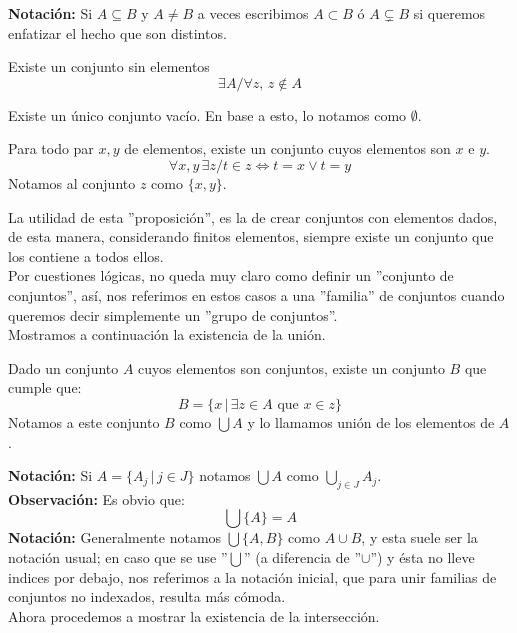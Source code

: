 \documentclass[12pt,a4paper]{book}
\begin{document}
\textbf{Notación:} Si $A \subseteq B$ y $A \neq B$ a veces escribimos $A \subset B$ ó $A \subsetneq B$ si queremos enfatizar el hecho que son distintos.

\begin{prop} %
Existe un conjunto sin elementos
$$ \exists A \slash \forall z , \, z \notin A $$ 
\end{prop}
\begin{ej}
Existe un único conjunto vacío. En base a esto, lo notamos como $\emptyset$.
\end{ej}
\begin{prop} %
Para todo par $x,y$ de elementos, existe un conjunto cuyos elementos son $x$ e $y$.
$$ \forall x,y \, \exists z \slash t\in z \Leftrightarrow t=x \vee t=y$$
Notamos al conjunto $z$ como $ \lbrace x,y \rbrace $.
\end{prop}
La utilidad de esta ''proposición'', es la de crear conjuntos con elementos dados, de esta manera, considerando finitos elementos, siempre existe un conjunto que los contiene a todos ellos. \\[0.5cm]
Por cuestiones lógicas, no queda muy claro como definir un ''conjunto de conjuntos'', así, nos referimos en estos casos a una ''familia'' de conjuntos cuando queremos decir simplemente un ''grupo de conjuntos''. \\[0.5 cm]
Mostramos a continuación la existencia de la unión.

\begin{prop} %
Dado un conjunto $A$ cuyos elementos son conjuntos, existe un conjunto $B$ que cumple que: \\
$$ B = \lbrace x \,\vert\, \exists z \in A \mbox{ que } x \in z \rbrace $$
Notamos a este conjunto $B$ como $\bigcup A$ y lo llamamos unión de los elementos de $A$.
\end{prop}

\textbf{Notación:} Si $A = \lbrace A_{j} \,\vert\, j \in J \rbrace$ notamos $\bigcup A$ como $\bigcup_{j\in J} A_{j}$.\\[0.5cm]
\textbf{Observación:} Es obvio que:
$$\bigcup \lbrace A \rbrace = A$$
\textbf{Notación:} Generalmente notamos $ \bigcup \lbrace A,B \rbrace$ como $A \cup B$, y esta suele ser la notación usual; en caso que se use ''$\bigcup$'' (a diferencia de ''$\cup$'') y ésta no lleve indices por debajo, nos referimos a la notación inicial, que para unir familias de conjuntos no indexados, resulta más cómoda.\\[0.5cm]
Ahora procedemos a mostrar la existencia de la intersección.
\end{document}

